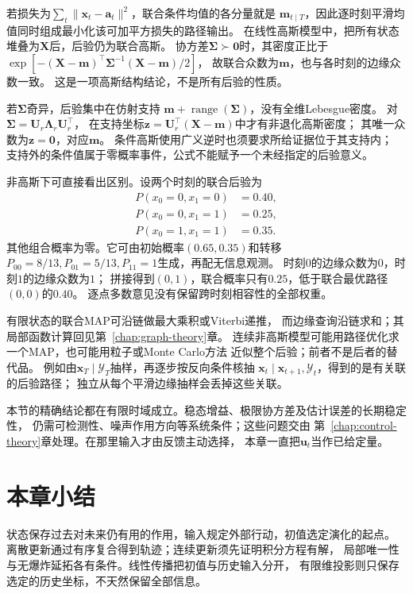 若损失为$\sum_t\|\bm x_t-\bm a_t\|^2$，联合条件均值的各分量就是
$\bm m_{t\mid T}$，因此逐时刻平滑均值同时组成最小化该可加平方损失的路径输出。
在线性高斯模型中，把所有状态堆叠为$\bm X$后，后验仍为联合高斯。
协方差$\bm\Sigma\succ\bm0$时，其密度正比于
$\exp[-(\bm X-\bm m)^\top\bm\Sigma^{-1}(\bm X-\bm m)/2]$，
故联合众数为$\bm m$，也与各时刻的边缘众数一致。
这是一项高斯结构结论，不是所有后验的性质。

若$\bm\Sigma$奇异，后验集中在仿射支持
$\bm m+\operatorname{range}(\bm\Sigma)$，没有全维Lebesgue密度。
对$\bm\Sigma=\bm U_r\bm\Lambda_r\bm U_r^\top$，
在支持坐标$\bm z=\bm U_r^\top(\bm X-\bm m)$中才有非退化高斯密度；
其唯一众数为$\bm z=\bm0$，对应$\bm m$。
条件高斯使用广义逆时也须要求所给证据位于其支持内；
支持外的条件值属于零概率事件，公式不能赋予一个未经指定的后验意义。

非高斯下可直接看出区别。设两个时刻的联合后验为
\[
 \begin{aligned}
  P(x_0=0,x_1=0)&=0.40,\\
  P(x_0=0,x_1=1)&=0.25,\\
  P(x_0=1,x_1=1)&=0.35.
 \end{aligned}
\]
其他组合概率为零。它可由初始概率$(0.65,0.35)$和转移
$P_{00}=8/13,P_{01}=5/13,P_{11}=1$生成，再配无信息观测。
时刻$0$的边缘众数为$0$，时刻$1$的边缘众数为$1$；
拼接得到$(0,1)$，联合概率只有$0.25$，低于联合最优路径$(0,0)$的$0.40$。
逐点多数意见没有保留跨时刻相容性的全部权重。

有限状态的联合MAP可沿链做最大乘积或Viterbi递推，
而边缘查询沿链求和；其局部函数计算回见第~\ref{chap:graph-theory}章。
连续非高斯模型可能用路径优化求一个MAP，也可能用粒子或Monte Carlo方法
近似整个后验；前者不是后者的替代品。
例如由$\bm x_T\mid\mathcal Y_T$抽样，再逐步按反向条件核抽
$\bm x_t\mid\bm x_{t+1},\mathcal Y_t$，得到的是有关联的后验路径；
独立从每个平滑边缘抽样会丢掉这些关联。

本节的精确结论都在有限时域成立。稳态增益、极限协方差及估计误差的长期稳定性，
仍需可检测性、噪声作用方向等系统条件；这些问题交由
第~\ref{chap:control-theory}章处理。在那里输入才由反馈主动选择，
本章一直把$\bm u_t$当作已给定量。

\section{本章小结}
\label{sec:dynamical-systems-state-estimation-summary}

状态保存过去对未来仍有用的作用，输入规定外部行动，初值选定演化的起点。
离散更新通过有序复合得到轨迹；连续更新须先证明积分方程有解，
局部唯一性与无爆炸延拓各有条件。线性传播把初值与历史输入分开，
有限维投影则只保存选定的历史坐标，不天然保留全部信息。

